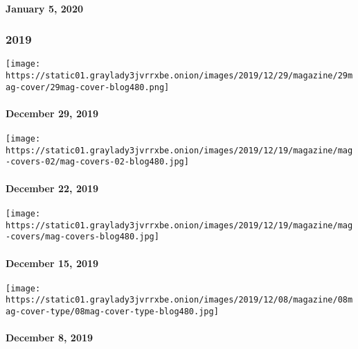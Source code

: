 \hypertarget{january-5-2020}{%
\paragraph{January 5, 2020}\label{january-5-2020}}

\hypertarget{2019}{%
\subsubsection{2019}\label{2019}}

\href{https://www.nytimes3xbfgragh.onion/issue/magazine/2019/12/24/the-122919-issue}{}

\texttt{[image: https://static01.graylady3jvrrxbe.onion/images/2019/12/29/magazine/29mag-cover/29mag-cover-blog480.png]}

\hypertarget{december-29-2019}{%
\paragraph{December 29, 2019}\label{december-29-2019}}

\href{https://www.nytimes3xbfgragh.onion/issue/magazine/2019/12/19/the-122219-issue}{}

\texttt{[image: https://static01.graylady3jvrrxbe.onion/images/2019/12/19/magazine/mag-covers-02/mag-covers-02-blog480.jpg]}

\hypertarget{december-22-2019}{%
\paragraph{December 22, 2019}\label{december-22-2019}}

\href{https://www.nytimes3xbfgragh.onion/issue/magazine/2019/12/19/the-121519-issue}{}

\texttt{[image: https://static01.graylady3jvrrxbe.onion/images/2019/12/19/magazine/mag-covers/mag-covers-blog480.jpg]}

\hypertarget{december-15-2019}{%
\paragraph{December 15, 2019}\label{december-15-2019}}

\href{https://www.nytimes3xbfgragh.onion/issue/magazine/2019/12/06/the-12819-issue}{}

\texttt{[image: https://static01.graylady3jvrrxbe.onion/images/2019/12/08/magazine/08mag-cover-type/08mag-cover-type-blog480.jpg]}

\hypertarget{december-8-2019}{%
\paragraph{December 8, 2019}\label{december-8-2019}}

